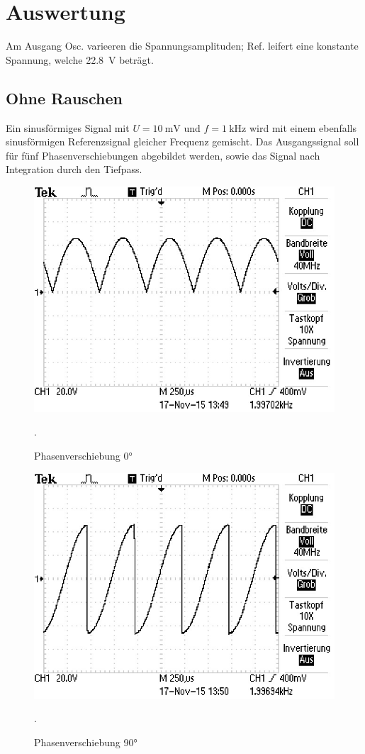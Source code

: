 \section{Auswertung}
\label{sec:Auswertung}
Am Ausgang Osc. varieeren die Spannungsamplituden; Ref. leifert eine konstante Spannung, welche \SI {22,8}{\volt} beträgt.

\subsection{Ohne Rauschen}
Ein sinusförmiges Signal mit $U = \SI{10}{\milli \volt}$ und $f = \SI{1}{\kilo \Hz}$ wird mit einem ebenfalls sinusförmigen Referenzsignal gleicher Frequenz gemischt. Das Ausgangssignal soll für fünf Phasenverschiebungen abgebildet werden, sowie das Signal nach Integration durch den Tiefpass.

\begin{figure}
  \centering
  \includegraphics[width=\textwidth]{bilder/Ohne Rauschen/1.JPG}
  \caption{Phasenverschiebung 0°}.
  \label{fig:bild1}
\end{figure}

\begin{figure}
  \centering
  \includegraphics[width=\textwidth]{bilder/Ohne Rauschen/2.JPG}
  \caption{Phasenverschiebung 90°}.
  \label{fig:bild2}
\end{figure}

